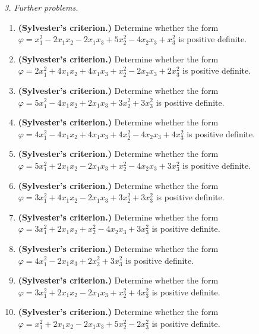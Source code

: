 \emph{3. Further problems.}
\bigskip
\begin{enumerate}[label=\arabic*., leftmargin=*]
\item \textbf{(Sylvester’s criterion.)} Determine whether the form $\varphi=x_1^2-2x_1x_2-2x_1x_3+5x_2^2-4x_2x_3+x_3^2$ is positive definite.
\item \textbf{(Sylvester’s criterion.)} Determine whether the form $\varphi=2x_1^2+4x_1x_2+4x_1x_3+x_2^2-2x_2x_3+2x_3^2$ is positive definite.
\item \textbf{(Sylvester’s criterion.)} Determine whether the form $\varphi=5x_1^2-4x_1x_2+2x_1x_3+3x_2^2+3x_3^2$ is positive definite.
\item \textbf{(Sylvester’s criterion.)} Determine whether the form $\varphi=4x_1^2-4x_1x_2+4x_1x_3+4x_2^2-4x_2x_3+4x_3^2$ is positive definite.
\item \textbf{(Sylvester’s criterion.)} Determine whether the form $\varphi=5x_1^2+2x_1x_2-2x_1x_3+x_2^2-4x_2x_3+3x_3^2$ is positive definite.
\item \textbf{(Sylvester’s criterion.)} Determine whether the form $\varphi=3x_1^2+4x_1x_2-2x_1x_3+3x_2^2+3x_3^2$ is positive definite.
\item \textbf{(Sylvester’s criterion.)} Determine whether the form $\varphi=3x_1^2+2x_1x_2+x_2^2-4x_2x_3+3x_3^2$ is positive definite.
\item \textbf{(Sylvester’s criterion.)} Determine whether the form $\varphi=4x_1^2-2x_1x_3+2x_2^2+3x_3^2$ is positive definite.
\item \textbf{(Sylvester’s criterion.)} Determine whether the form $\varphi=3x_1^2+2x_1x_2-2x_1x_3+x_2^2+4x_3^2$ is positive definite.
\item \textbf{(Sylvester’s criterion.)} Determine whether the form $\varphi=x_1^2+2x_1x_2-2x_1x_3+5x_2^2-2x_3^2$ is positive definite.
\end{enumerate}


